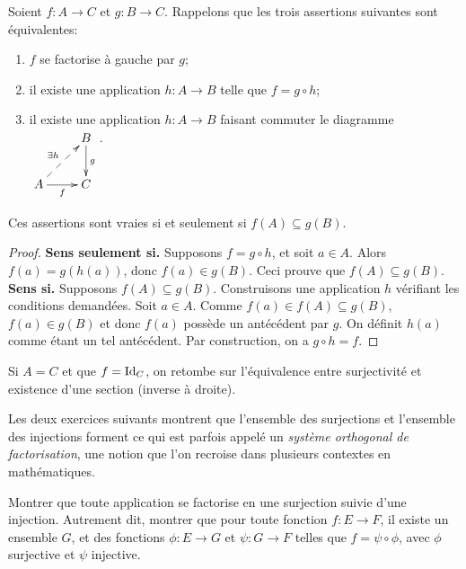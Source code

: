 \begin{proposition}
\label{factorisation-gauche}
Soient $f : A\to C$ et $g : B\to C$. Rappelons que les trois assertions suivantes sont équivalentes:
\begin{enumerate}
\item  $f$ se factorise à gauche par $g$;
\item il existe une application $h : A\to B$ telle que $f = g\circ h$;
\item il existe une application $h : A\to B$ faisant commuter le diagramme  
$\xymatrix{
&B \ar[d]^{g} \\
A \ar[r]_f \ar@{-->}[ur]^{\exists h}& C
}$.
\end{enumerate}
Ces assertions sont vraies si et seulement si $f(A)\subseteq g(B)$.
\end{proposition}
\begin{proof}
\textbf{Sens \og seulement si\fg.} Supposons $f = g\circ h$, et soit $a\in A$. Alors $f(a) = g(h(a))$, donc $f(a) \in g(B)$. Ceci prouve que $f(A)\subseteq g(B)$.\\
\textbf{Sens \og si\fg.} Supposons $f(A)\subseteq g(B)$. Construisons une application $h$ vérifiant les conditions demandées. Soit $a\in A$. Comme $f(a) \in f(A) \subseteq g(B)$, $f(a) \in g(B)$ et donc $f(a)$ possède un antécédent par $g$. On définit $h(a)$ comme étant un tel antécédent. Par construction, on a $g\circ h = f$.
\end{proof}

\begin{remarque}
Si $A = C$ et que $f = \operatorname{Id}_C$, on retombe sur l'équivalence entre surjectivité et existence d'une section (inverse à droite).
\end{remarque}

Les deux exercices suivants montrent que l'ensemble des surjections et l'ensemble des injections forment ce qui est parfois appelé un \emph{système orthogonal de factorisation}, une notion que l'on recroise dans plusieurs contextes en mathématiques.

\begin{exercice}
Montrer que toute application se factorise en une surjection suivie d'une injection. Autrement dit, montrer que pour toute fonction $f : E\to F$, il existe un ensemble $G$, et des fonctions $\phi : E\to G$ et $\psi : G\to F$ telles que $f = \psi\circ \phi$, avec $\phi$ surjective et $\psi$ injective.
\end{exercice}

